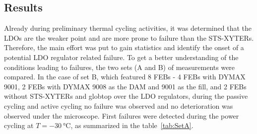 \subsection{Results}
Already during preliminary thermal cycling activities, it was determined that the \gls{LDO}s are the weaker point and are more prone to failure than the \gls{STS}-XYTERs. Therefore, the main effort was put to gain statistics and identify the onset of a potential \gls{LDO} regulator related failure. To get a better understanding of the conditions leading to failures, the two sets (A and B) of measurements were compared. 
In the case of set B, which featured 8 \glspl{FEB} - 4 \glspl{FEB} with DYMAX 9001, 2 \glspl{FEB} with DYMAX 9008 as the DAM and 9001 as the fill, and 2 \glspl{FEB} without \gls{STS}-XYTERs and globtop over the \gls{LDO} regulators, during the passive cycling and active cycling no failure was observed and no deterioration was observed under the microscope. First failures were detected during the power cycling at $T=\SI{-30}{\celsius}$, as summarized in the table~\ref{tab:SetA}. 
\begin{table}[!h]
\centering
{}
\caption{Detailed description of the \gls{LDO} failure with regard to the type and number
of cycles}
\label{tab:SetA}
\end{table}

